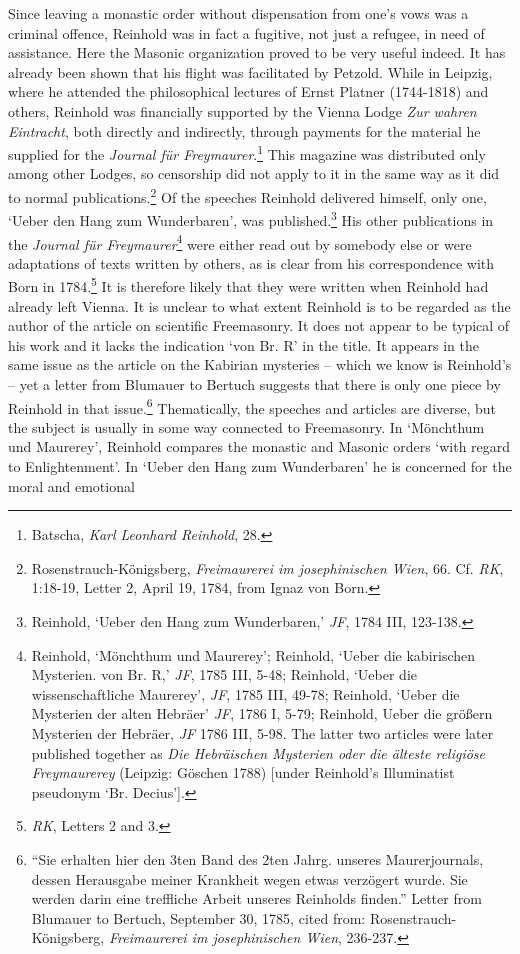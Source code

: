 Since leaving a monastic order without dispensation from one's vows was a criminal offence, Reinhold was in fact a fugitive, not just a refugee, in need of assistance. Here the Masonic organization proved to be very useful indeed. It has already been shown that his flight was facilitated by Petzold. While in Leipzig, where he attended the philosophical lectures of Ernst Platner (1744{-}1818) and others, Reinhold was financially supported by the Vienna Lodge \textit{Zur wahren Eintracht}, both directly and indirectly, through payments for the material he supplied for the \textit{Journal f\"{u}r Freymaurer}.\footnote{ Batscha, \textit{Karl Leonhard Reinhold}, 28. } This magazine was distributed only among other Lodges, so censorship did not apply to it in the same way as it did to normal publications.\footnote{ Rosenstrauch{-}K\"{o}nigsberg, \textit{Freimaurerei im josephinischen Wien}, 66. Cf. \textit{RK}, 1:18{-}19, Letter 2, April 19, 1784, from Ignaz von Born.} Of the speeches Reinhold delivered himself, only one, `Ueber den Hang zum Wunderbaren', was published.\footnote{ Reinhold, `Ueber den Hang zum Wunderbaren,' \textit{JF}, 1784 III, 123{-}138. } His other publications in the \textit{Journal f\"{u}r Freymaurer}\footnote{ Reinhold, `M\"{o}nchthum und Maurerey'; Reinhold, `Ueber die kabirischen Mysterien. von Br. R\textasteriskcentered \textasteriskcentered ,' \textit{JF}, 1785 III, 5{-}48; Reinhold, `Ueber die wissenschaftliche Maurerey', \textit{JF}, 1785 III, 49{-}78; Reinhold, `Ueber die Mysterien der alten Hebr\"{a}er' \textit{JF}, 1786 I, 5{-}79; Reinhold, Ueber die gr\"{o}\ss{}ern Mysterien der Hebr\"{a}er, \textit{JF} 1786 III, 5{-}98. The latter two articles were later published together as \textit{Die Hebr\"{a}ischen Mysterien oder die \"{a}lteste religi\"{o}se Freymaurerey} (Leipzig: G\"{o}schen 1788) [under Reinhold's Illuminatist pseudonym `Br. Decius']. } were either read out by somebody else or were adaptations of texts written by others, as is clear from his correspondence with Born in 1784.\footnote{ \textit{RK}, Letters 2 and 3. } It is therefore likely that they were written when Reinhold had already left Vienna. It is unclear to what extent Reinhold is to be regarded as the author of the article on scientific Freemasonry. It does not appear to be typical of his work and it lacks the indication `von Br. R\textasteriskcentered \textasteriskcentered ' in the title. It appears in the same issue as the article on the Kabirian mysteries {--} which we know is Reinhold's {--} yet a letter from Blumauer to Bertuch suggests that there is only one piece by Reinhold in that issue.\footnote{ ``Sie erhalten hier den 3ten Band des 2ten Jahrg. unseres Maurerjournals, dessen Herausgabe meiner Krankheit wegen etwas verz\"{o}gert wurde. Sie werden darin eine treffliche Arbeit unseres Reinholds finden.'' Letter from Blumauer to Bertuch, September 30, 1785, cited from: Rosenstrauch{-}K\"{o}nigsberg, \textit{Freimaurerei im josephinischen Wien}, 236{-}237. } Thematically, the speeches and articles are diverse, but the subject is usually in some way connected to Freemasonry. In `M\"{o}nchthum und Maurerey', Reinhold compares the monastic and Masonic orders `with regard to Enlightenment'. In `Ueber den Hang zum Wunderbaren' he is concerned for the moral and emotional 